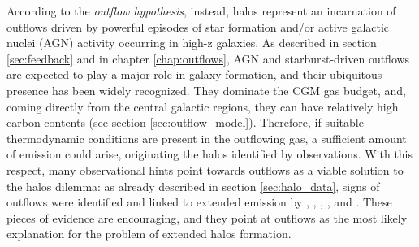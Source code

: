 According to the \textit{outflow hypothesis}, instead, halos represent an incarnation of outflows driven by powerful episodes of star formation and/or active galactic nuclei (AGN) activity occurring in high-z galaxies. As described in section \ref{sec:feedback} and in chapter \ref{chap:outflows}, AGN and starburst-driven outflows are expected to play a major role in galaxy formation, and their ubiquitous presence has been widely recognized. They dominate the CGM gas budget, and, coming directly from the central galactic regions, they can have relatively high carbon contents (see section \ref{sec:outflow_model}). Therefore, if suitable thermodynamic conditions are present in the outflowing gas, a sufficient amount of \CII emission could arise, originating the \CII halos identified by observations. With this respect, many observational hints point towards outflows as a viable solution to the \CII halos dilemma: as already described in section \ref{sec:halo_data}, signs of outflows were identified and linked to \CII extended emission by \citet{cicone2015}, \citet{gallerani:2018}, \citet{ginolfi:2019}, \citet{Fujimoto:2020qzo}, and \citet{herrera2021kiloparsec}. These pieces of evidence are encouraging, and they point at outflows as the most likely explanation for the problem of extended halos formation. 


